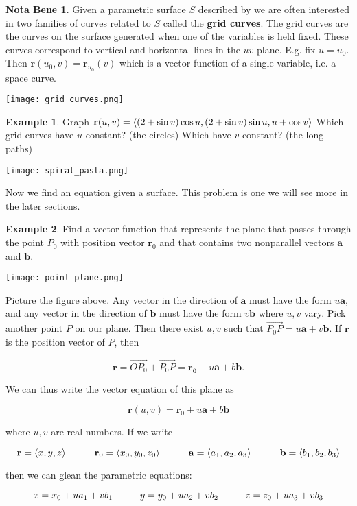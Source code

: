 \documentclass[11pt,oneside,english]{amsart}
\theoremstyle{definition}
\newtheorem*{example}{Example}
\newtheorem*{note}{Nota Bene}
\newcommand{\pspace}{\hspace{10mm}}
\newcommand{\ovec}[1]{\overrightarrow{#1}}
\def\<#1>{\mathinner{\langle#1\rangle}}
\begin{document}
\begin{note}
Given a parametric surface $S$ described by we are often interested in two families of curves related to $S$ called the \textbf{grid curves}. The grid curves are the curves on the surface generated when one of the variables is held fixed. These curves correspond to vertical and horizontal lines in the $uv$-plane. E.g. fix $u=u_0$. Then $\mathbf{r}(u_0,v)=\mathbf{r}_{u_0}(v)$ which is a vector function of a single variable, i.e. a space curve.

\begin{center}
\texttt{[image: grid\_curves.png]}
\end{center}
\end{note}

\begin{example}

Graph $\mathbf{r}(u,v)=\<(2+\sin v)\cos u,(2+\sin v)\sin u,u+\cos v>$ Which grid curves have $u$ constant? (the circles) Which have $v$ constant? (the long paths)
\begin{center}
\texttt{[image: spiral\_pasta.png]}
\end{center}
\end{example}


Now we find an equation given a surface. This problem is one we will see more in the later sections.

\pagebreak

\begin{example}
Find a vector function that represents the plane that passes through the point $P_0$ with position vector $\mathbf{r}_0$ and that contains two nonparallel vectors $\mathbf{a}$ and $\mathbf{b}$.

\begin{center}
\texttt{[image: point\_plane.png]}
\end{center}

Picture the figure above. Any vector in the direction of $\mathbf{a}$ must have the form $u\mathbf{a}$, and any vector in the direction of $\mathbf{b}$ must have the form $v\mathbf{b}$ where $u,v$ vary. Pick another point $P$ on our plane. Then there exist $u,v$ such that $\ovec{P_0P}=u\mathbf{a}+v\mathbf{b}$. If $\mathbf{r}$ is the position vector of $P$, then

\[
\mathbf{r}=\ovec{OP_0}+\ovec{P_0P}=\mathbf{r_0}+u\mathbf{a}+b\mathbf{b}.
\]

We can thus write the vector equation of this plane as

\[
\mathbf{r}(u,v)=\mathbf{r}_0+u\mathbf{a}+b\mathbf{b}
\]

where $u,v$ are real numbers. If we write

\[
\mathbf{r}=\<x,y,z>\pspace \mathbf{r}_0=\<x_0,y_0,z_0>\pspace \mathbf{a}=\<a_1,a_2,a_3>\pspace \mathbf{b}=\<b_1,b_2,b_3>
\]

then we can glean the parametric equations:

\[
x=x_0+ua_1+vb_1\pspace y=y_0+ua_2+vb_2\pspace z=z_0+ua_3+vb_3
\]
\end{example}
\end{document}
